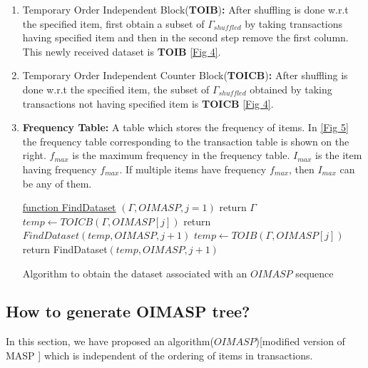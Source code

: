 \documentclass[review]{elsarticle}
\begin{document}
\begin{enumerate}[1.]
\item Temporary Order Independent Block(\textbf{TOIB})\textbf{:} After shuffling is done w.r.t the specified item, first obtain a subset of $ \Gamma _{shuffled} $ by taking transactions having specified item and then in the second step remove the first column. This newly received dataset is \textbf{TOIB} \ref{Fig 4}.

\item Temporary Order Independent Counter Block(\textbf{TOICB})\textbf{:} After shuffling is done w.r.t the specified item, the subset of $ \Gamma _{shuffled} $ obtained by taking transactions not having specified item is \textbf{TOICB} \ref{Fig 4}.

\item \textbf{Frequency Table:} A table which stores the frequency of items. In \ref{Fig 5} the frequency table corresponding to the transaction table is shown on the right. $ f_{max} $ is the maximum frequency in the frequency table. $ I_{max} $ is the item having frequency $ f_{max} $. If multiple items have frequency $ f_{max} $, then $ I_{max} $ can be any of them.

\begin{algorithm}

    \underline{function FindDataset} $ (\Gamma, OIMASP, j = 1) $\;
      {
        return $ \Gamma $
      }     
      {
        $ temp \leftarrow TOICB(\Gamma, OIMASP[j]) $\;
		return $ FindDataset(temp, OIMASP, j+1) $
      }
      {
		$ temp \leftarrow TOIB(\Gamma, OIMASP[j]) $\;
		return FindDataset$(temp, OIMASP, j+1)$
      }      
    \caption{Algorithm to obtain the dataset associated with an $ OIMASP $ sequence}
\end{algorithm}

\end{enumerate}

\subsection{How to generate OIMASP tree?}
In this section, we have proposed an algorithm($ OIMASP $)[modified version of MASP \cite{oldmasp}] which is independent of the ordering of items in transactions.
\end{document}
